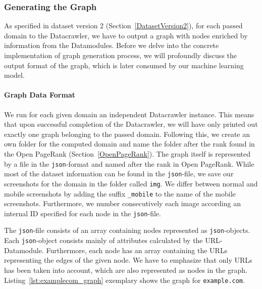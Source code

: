 \subsubsection{Generating the Graph}
\label{datacrawler_graph}
As specified in dataset version 2 (Section~\ref{DatasetVersion2}), for each passed domain to the Datacrawler, we have to output a graph with nodes enriched by information from the Datamodules. Before we delve into the concrete implementation of graph generation process, we will profoundly discuss the output format of the graph, which is later consumed by our machine learning model.

\paragraph*{Graph Data Format}
We run for each given domain an independent Datacrawler instance. This means that upon successful completion of the Datacrawler, we will have only printed out exactly one graph belonging to the passed domain. Following this, we create an own folder for the computed domain and name the folder after the rank found in the Open PageRank (Section~\ref{OpenPageRank}). The graph itself is represented by a file in the \texttt{json}-format and named after the rank in Open PageRank. While most of the dataset information can be found in the \texttt{json}-file, we save our screenshots for the domain in the folder called \texttt{img}. We differ between normal and mobile screenshots by adding the suffix \texttt{\_mobile} to the name of the mobile screenshots. Furthermore, we number consecutively each image according an internal ID specified for each node in the \texttt{json}-file.

The \texttt{json}-file consists of an array containing nodes represented as \texttt{json}-objects. Each \texttt{json}-object consists mainly of attributes calculated by the URL-Datamodule. Furthermore, each node has an array containing the URLs representing the edges of the given node. We have to emphasize that only URLs has been taken into account, which are also represented as nodes in the graph. Listing~\ref{lst:examplecom_graph} exemplary shows the graph for \texttt{example.com}.

